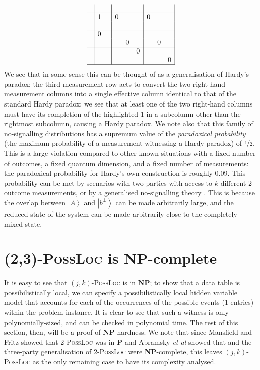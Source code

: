 \documentclass[reprint]{revtex4-1}
\theoremstyle{definition}
\newcommand{\ket}[1]{{\left\vert{#1}\right\rangle}}
\begin{document}
\begin{equation*}
\begin{array}{ c | c c | c c c| c c c|}
&&&&&&&& \\ \hline
&1&&0&&&0&&\\
   &&&&&&&&\\ \hline
   &0&&&&&&&\\ 
  &&&&0&&&0&\\ \hline
  &&&&&0&&&\\ 
  &&&&&&&&0\\ \hline
\end{array}
\end{equation*}
We see that in some sense this can be thought of as a generalisation of Hardy's paradox; the third measurement row acts to convert the two right-hand measurement columns into a single effective column identical to that of the standard Hardy paradox; we see that at least one of the two right-hand columns must have its completion of the highlighted 1 in a subcolumn other than the rightmost subcolumn, causing a Hardy paradox. We note also that this family of no-signalling distributions has a supremum value of the \emph{paradoxical probability} (the maximum probability of a measurement witnessing a Hardy paradox) of $\nicefrac{1}{2}$. This is a large violation compared to other known situations with a fixed number of outcomes, a fixed quantum dimension, and a fixed number of measurements: the paradoxical probability for Hardy's own construction is roughly 0.09. This probability can be met by scenarios with two parties with access to $k$ different 2-outcome measurements, or by a generalised no-signalling theory \cite{Mans2017}. This is because the overlap between $\ket{A}$ and $\ket{b^\perp}$ can be made arbitrarily large, and the reduced state of the system can be made arbitrarily close to the completely mixed state.


\section{\textsc{(2,3)-PossLoc} is \textbf{NP}-complete}


It is easy to see that $(j,k)$-\textsc{PossLoc} is in \textbf{NP}; to show that a data table is possibilistically local, we can specify a possibilistically local hidden variable model that accounts for each of the occurrences of the possible events (1 entries) within the problem instance. It is clear to see that such a witness is only polynomially-sized, and can be checked in polynomial time. The rest of this section, then, will be a proof of \textbf{NP}-hardness. We note that since Mansfield and Fritz \cite{Mans2011} showed that \textsc{2-PossLoc} was in \textbf{P} and Abramsky \emph{et al} showed that   and the three-party generalisation of \textsc{2-PossLoc} were \textbf{NP}-complete, this leaves $(j,k)$-\textsc{PossLoc} as the only remaining case to have its complexity analysed.
\end{document}
